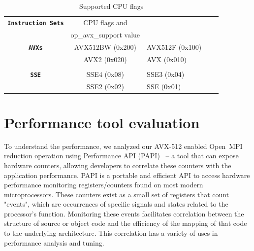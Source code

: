 \documentclass[5p,times,twocolumn]{elsarticle}
\newcommand{\ompi}[0]{Open~MPI\xspace}
\begin{document}
\begin{table}
  \centering
  \caption{Supported CPU flags}\label{fig:cpuflags}
  \label{tab:parameters1}
  \small
  \begin{tabular}{cclll}
    \toprule
    \texttt{\bf Instruction Sets} & CPU flags and & \\ & op_avx_support value & \\
    \midrule
    \texttt{\bf AVXs} & AVX512BW (0x200) & AVX512F (0x100) \\ & AVX2  (0x020) & AVX   (0x010) \\ \\
      \texttt{\bf SSE} & SSE4 (0x08) & SSE3 (0x04) \\ & SSE2 (0x02) & SSE (0x01) \\
      \bottomrule
  \end{tabular}
\end{table}

\section{Performance tool evaluation}\label{sec:perf}
To understand the performance, we analyzed our AVX-512 enabled \ompi reduction
operation using Performance API (PAPI)~\cite{papi} -- a tool that can expose
hardware counters, allowing developers to correlate these counters
with the application performance.
PAPI is a portable and efficient API to access hardware performance
monitoring registers/counters found on most modern microprocessors.
These counters exist
as a small set of registers that count "events", which are occurrences of specific signals
and states related to the processor's function. Monitoring these events facilitates
correlation between the structure of source or object code and the efficiency of the mapping
of that code to the underlying architecture. This correlation has a variety of uses in
performance analysis and tuning.

\end{document}
